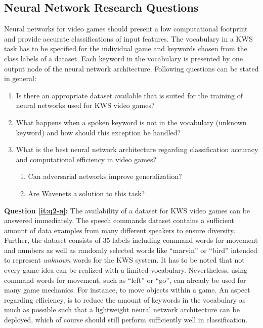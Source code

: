 \subsection{Neural Network Research Questions}\label{sec:intro_rq_nn}
Neural networks for video games should present a low computational footprint and provide accurate classifications of input features.
The vocabulary in a KWS task has to be specified for the individual game and keywords chosen from the class labels of a dataset.
Each keyword in the vocabulary is presented by one output node of the neural network architecture.
Following questions can be stated in general:
\begin{enumerate}[label={Q.2.\alph*)}, leftmargin=1.75cm]
  \item Is there an appropriate dataset available that is suited for the training of neural networks used for KWS video games?\label{it:q2-a}
  \item What happens when a spoken keyword is not in the vocabulary (unknown keyword) and how should this exception be handled?\label{it:q2-b}
  \item What is the best neural network architecture regarding classification accuracy and computational efficiency in video games?\label{it:q2-c}
  \begin{enumerate}[label=(\roman*)]
    \item Can adversarial networks improve generalization?
    \item Are Wavenets a solution to this task?
  \end{enumerate}
\end{enumerate}
\noindent
\textbf{Question \ref{it:q2-a}:} 
The availability of a dataset for KWS video games can be answered immediately. 
The speech commands dataset \cite{Warden2018} contains a sufficient amount of data examples from many different speakers to ensure diversity.
Further, the dataset consists of 35 labels including command words for movement and numbers as well as randomly selected words like \enquote{marvin} or \enquote{bird} intended to represent \emph{unknown} words for the KWS system.
It has to be noted that not every game idea can be realized with a limited vocabulary.
Nevertheless, using command words for movement, such as \enquote{left} or \enquote{go}, can already be used for many game mechanics.
For instance, to move objects within a game.
An aspect regarding efficiency, is to reduce the amount of keywords in the vocabulary as much as possible such that a lightweight neural network architecture can be deployed, which of course should still perform sufficiently well in classification.

